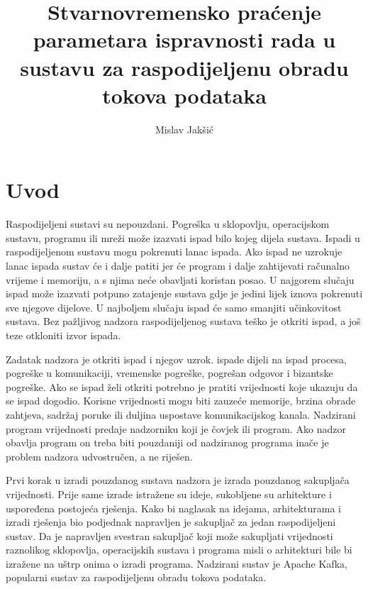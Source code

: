 \documentclass[times, utf8, diplomski, numeric]{fer}
\begin{document}

\title{Stvarnovremensko praćenje parametara ispravnosti rada u sustavu za raspodijeljenu obradu tokova podataka}

\author{Mislav Jakšić}

\maketitle

\izvornik


\tableofcontents

\chapter{Uvod}

Raspodijeljeni sustavi su nepouzdani. Pogreška u sklopovlju, operacijskom sustavu, programu ili mreži može izazvati ispad bilo kojeg dijela sustava. Ispadi u raspodijeljenom sustavu mogu pokrenuti lanac ispada. Ako ispad ne uzrokuje lanac ispada sustav će i dalje patiti jer će program i dalje zahtijevati računalno vrijeme i memoriju, a s njima neće obavljati koristan posao. U najgorem slučaju ispad može izazvati potpuno zatajenje sustava gdje je jedini lijek iznova pokrenuti sve njegove dijelove. U najboljem slučaju ispad će samo smanjiti učinkovitost sustava. Bez pažljivog nadzora raspodijeljenog sustava teško je otkriti ispad, a još teze otkloniti izvor ispada.

Zadatak nadzora je otkriti ispad i njegov uzrok. \citep{rassus-manual} ispade dijeli na ispad procesa, pogreške u komunikaciji, vremenske pogreške, pogrešan odgovor i bizantske pogreške. Ako se ispad želi otkriti potrebno je pratiti vrijednosti koje ukazuju da se ispad dogodio. Korisne vrijednosti mogu biti zauzeće memorije, brzina obrade zahtjeva, sadržaj poruke ili duljina uspostave komunikacijskog kanala. Nadzirani program vrijednosti predaje nadzorniku koji je čovjek ili program. Ako nadzor obavlja program on treba biti pouzdaniji od nadziranog programa inače je problem nadzora udvostručen, a ne riješen.

Prvi korak u izradi pouzdanog sustava nadzora je izrada pouzdanog sakupljača vrijednosti. Prije same izrade istražene su ideje, sukobljene su arhitekture i uspoređena postojeća rješenja. Kako bi naglasak na idejama, arhitekturama i izradi rješenja bio podjednak napravljen je sakupljač za jedan raspodijeljeni sustav. Da je napravljen svestran sakupljač koji može sakupljati vrijednosti raznolikog sklopovlja, operacijskih sustava i programa misli o arhitekturi bile bi izražene na uštrp onima o izradi programa. Nadzirani sustav je Apache Kafka, popularni sustav za raspodijeljenu obradu tokova podataka.
\end{document}
